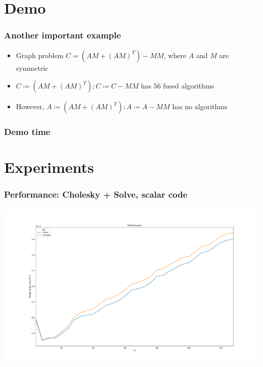 \documentclass{beamer}
\begin{document}
\section{Demo}

\frame{\sectionpage}

\begin{frame}
  \frametitle{Another important example}
  \begin{itemize}
  \item Graph problem $C = (AM + (AM)^T) - MM$, where $A$ and $M$ are symmetric
  \item $C \coloneqq (AM + (AM)^T); C \coloneqq C - MM$ has $56$ fused algorithms
  \item However, $A \coloneqq (AM + (AM)^T); A \coloneqq A - MM$ has no algorithms
  \end{itemize}
\end{frame}

\begin{frame}
  \frametitle{Demo time}
\end{frame}

\section{Experiments}

\begin{frame}
  \frametitle{Performance: Cholesky + Solve, scalar code}
   \includegraphics[height=0.95\textheight, trim={2cm 0 2cm 0}, clip]{../experiments/benchmarks_chol_trsm_small_mats_more_points_1divsq}
\end{frame}
\end{document}

